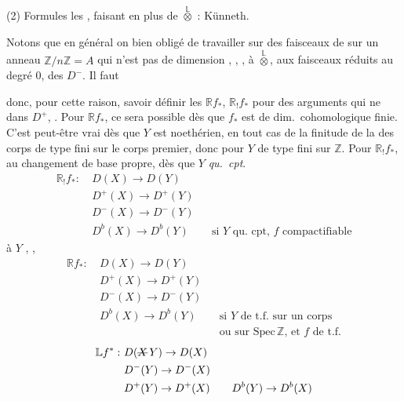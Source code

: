 \documentclass[11pt,a4paper]{article}
\begin{document}
(2) Formules  les \ill{}, faisant   en plus de $\overset{\mathbb{L}}{\otimes}$ : Künneth.


Notons que en général on  bien obligé de travailler sur des faisceaux de  sur un anneau $\mathbb{Z}/n\mathbb{Z} = A$ qui n'est pas de dimension  , \ill{} \ill{} \ill{} \ill{} \ill{} \ill{}, \ill{} \ill{}   , \ill{} \ill{} à  \ill{} $\overset{\mathbb{L}}{\otimes}$, \ill{} \ill{} \ill{} \ill{} aux faisceaux réduits au degré $0$, \ill{} \ill{} \ill{} des $D^{-}$. Il faut

donc, pour cette raison, savoir définir les $\mathbb{R}f_{*}$, $\mathbb{R}_{!}f_{*}$ pour des arguments qui ne    dans $D^{+}$, . Pour $\mathbb{R}f_{*}$, ce sera possible dès que $f_{*}$ est de dim.\ cohomologique finie. C'est peut-être vrai dès que $Y$ est noethérien,  \struck{\ill{}} en tout cas de la finitude de la   des corps de type fini sur le corps premier, \struck{\ill{}} donc  pour $Y$ de type fini sur $\mathbb{Z}$. Pour $\mathbb{R}_{!}f_{*}$, \ill{} \ill{} \ill{} \ill{} au changement de base propre, \ill{} dès que $Y$ \emph{qu.\ cpt}. \ill{} \ill{}
\begin{align*}
  \mathbb{R}_{!}f_{*} :\ & D(X) \to D(Y) \\
  & D^{+}(X) \to D^{+}(Y) \\
  & D^{-}(X) \to D^{-}(Y) \\
  & D^{b}(X) \to D^{b}(Y)
  && \text{si $Y$ qu.\ cpt, $f$ compactifiable}
\end{align*}
 à $Y$ \ill{}, \ill{},
\begin{align*}
  \mathbb{R}f_{*} :\ & D(X) \to D(Y) \\
  & D^{+}(X) \to D^{+}(Y) \\
  & D^{-}(X) \to D^{-}(Y) \\
  & D^{b}(X) \to D^{b}(Y)
  && \text{si $Y$ de t.f.\ sur un corps}\\
  &&& \text{ou sur $\mathrm{Spec}\, \mathbb{Z}$, et $f$ de t.f.}
\end{align*}
\begin{align*}
  \mathbb{L}f^{*} :\ & D(\text{\struck{$X$}}\, Y) \to D(X) \\
  & D^{-}(Y) \to D^{-}(X) \\
  & D^{+}(Y) \to D^{+}(X)
  \qquad D^{b}(Y) \to D^{b}(X)
\end{align*}
\end{document}

